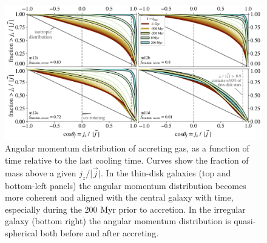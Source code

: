 \documentclass[fleqn,usenatbib]{mnras}
\begin{document}
\begin{figure}
    \centering
    \includegraphics[width=\textwidth]{figures/variations/relative_to_accretion/jzjmag_vs_t.pdf}
    \caption{
    Angular momentum distribution of accreting gas, as a function of time relative to the last cooling time.
    Curves show the fraction of mass above a given $j_z / \vert \vec j \vert$. 
    In the thin-disk galaxies (top and bottom-left panels) the angular momentum distribution becomes more coherent and aligned with the central galaxy with time, especially during the 200 Myr prior to accretion.
    In the irregular galaxy (bottom right) the angular momentum distribution is quasi-spherical both before and after accreting. 
    }
    \label{f: coherence}
\end{figure}
\end{document}
